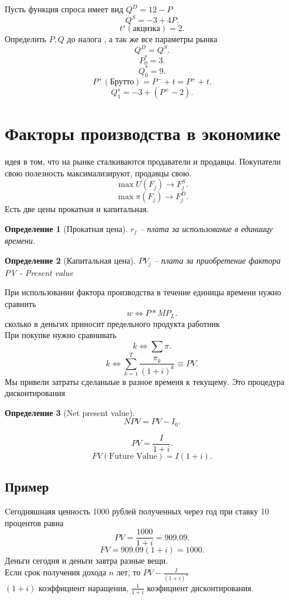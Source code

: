 \documentclass[14pt]{extarticle}
\newtheorem{definition}{Определение}
\begin{document}
\section{}
Пусть функция спроса имеет вид $Q^{D} =  12  - P$
 \[
 Q^{S} = -3 + 4P
 .\] 
 \[
     t^{s} (\text{акцизка}) = 2
 .\] 
 Определить $P,Q$ до налога , а так же все параметры рынка
 \[
 Q^{D} = Q^{S}
 .\] 
 \[
 P_0^{*} = 3
 .\] 
 \[
 Q_0^{*} = 9
 .\] 
 \[
     P^{+} (\text{Брутто}) = P^{-} +t = P^{+} + t
 .\] 
 \[
 Q_1^{s} = -3 + (P^{+} - 2)
 .\] 
 \section{Факторы производства в экономике}
 идея в том, что на рынке сталкиваются продаватели и продавцы. Покупатели свою полезность максимализируют, продавцы свою.
 \[
 \max U(F_{j}) \to F_{j}^{S}
 .\] 
 \[
 \max  \pi(F_{j}) \to F_{j}^{D}
 .\] 
 Есть две цены прокатная и капитальная.
 \begin{definition}[Прокатная цена]
     $r_{j}$ -- плата за использование в единиицу времени.
 \end{definition}
 \begin{definition}[Капитальная цена]
     $PV_{j}$ -- плата за приобретение фактора\\
     PV - Present value
 \end{definition}
 При использовании фактора производства в течение единицы времени нужно сравнить
 \[
 w \iff P * MP_{L}
 .\] 
 сколько в деньгих приносит предельного продукта работник\\
 При покупке нужно сравнивать
 \[
 k \iff \sum \pi
 .\] 
 \[
 k \iff \sum_{k=1}^{T} \frac{\pi_{k}}{(1 + i)^{k}} \equiv PV
 .\] 
 Мы привели затраты сделаныые в разное временя к текущему. Это процедура дисконтирования
 \begin{definition}[Net present value]
     \[
     NPV = PV - I_0
     .\] 
 \end{definition}
 \[
 PV = \frac{I}{1 + i}
 .\] 
 \[
     FV(\text{Future Value}) = I(1 + i)
 .\] 
 \subsection{Пример}
 Cегодняшнаяя ценность 1000 рублей полученных через год при ставку 10 процентов равна
 \[
 PV = \frac{1000}{1 + i} = 909.09
 .\] 
 \[
 FV = 909.09(1  + i) = 1000
 .\] 
 Деньги сегодня и деньги завтра разные вещи.\\
 Если срок получения дохода $n$ лет, то  $PV - \frac{I}{(1 + i)^{n}}$ \\
 $(1 + i)$ коэффициент наращения,  $\frac{1}{1 + i}$ коэфициент дисконтирования.
\end{document}
